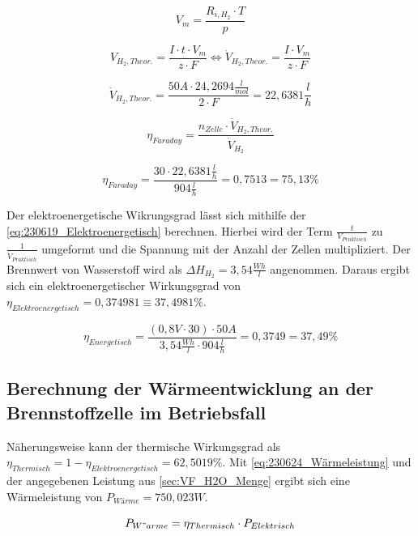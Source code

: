 \begin{equation}
    V_m = \frac{R_{i,H_2} \cdot T}{p}
    \label{eq:230624_Molaresvolumen}
\end{equation}

\begin{equation}
    V_{H_2,Theor.} = \frac{I \cdot t \cdot V_m}{z \cdot F} \Leftrightarrow  \dot{V}_{H_2,Theor.} = \frac{I \cdot V_m}{z \cdot F}
    \label{eq:230624_Volumenstrom-theor}
\end{equation}

$$\dot{V}_{H_2,Theor.} = \frac{50 A \cdot 24,2694 \frac{l}{mol}}{2 \cdot F}= 22,6381 \frac{l}{h}$$

\begin{equation}
    \eta_{Faraday} = \frac{n_{Zelle} \cdot \dot{V}_{H_2,Theor.}}{\dot{V}_{H_2}}
    \label{eq:230624_Faraday-Wirkungsgrad}
\end{equation}

$$\eta_{Faraday} = \frac{30 \cdot 22,6381 \frac{l}{h}}{904 \frac{l}{h}}= 0,7513=75,13\%$$


Der elektroenergetische Wikrungsgrad lässt sich mithilfe der \autoref{eq:230619_Elektroenergetisch} berechnen.
Hierbei wird der Term $\frac{t}{V_{Praktisch}}$ zu $\frac{1}{\dot{V}_{Praktisch}}$ umgeformt und die Spannung mit der Anzahl der Zellen multipliziert.
Der Brennwert von Wasserstoff wird als $\Delta H_{H_2} = 3,54\frac{Wh}{l}$ \cite{dH-H2} angenommen.
Daraus ergibt sich ein elektroenergetischer Wirkungsgrad von $\eta_{Elektroenergetisch} = 0,374981 \equiv 37,4981 \%$.

$$\eta_{Energetisch} = \frac{(0,8V \cdot 30) \cdot 50A}{3,54 \frac{Wh}{l} \cdot 904 \frac{l}{h}}=0,3749=37,49 \%$$

\subsection{Berechnung der Wärmeentwicklung an der Brennstoffzelle im Betriebsfall}

Näherungsweise kann der thermische Wirkungsgrad als $\eta_{Thermisch} = 1 - \eta_{Elektroenergetisch} = 62,5019 \%$.
Mit \autoref{eq:230624_Wärmeleistung} und der angegebenen Leistung aus \autoref{sec:VF_H2O_Menge} ergibt sich eine Wärmeleistung von $P_{Wärme} = 750,023 W$. 

\begin{equation}
    P_{W"arme} = \eta_{Thermisch} \cdot P_{Elektrisch}
    \label{eq:230624_Wärmeleistung}
\end{equation}

